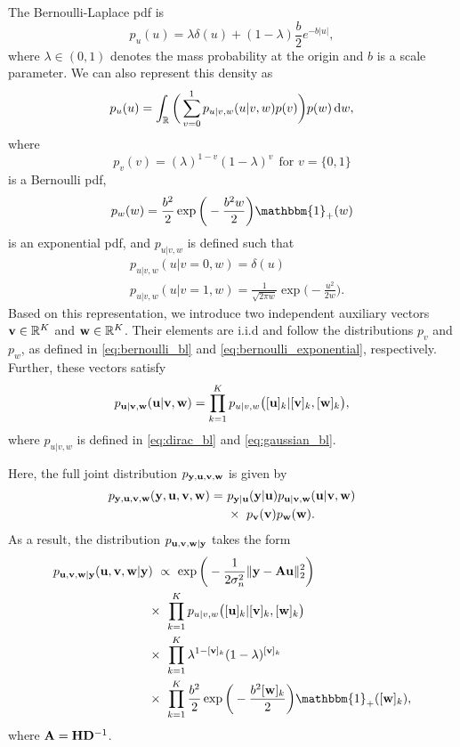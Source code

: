 \documentclass[journal]{IEEEtran}
\begin{document}
The Bernoulli-Laplace pdf is
\begin{equation}\label{eq:pdf_bl}
    p_u(u) = \lambda \delta(u) + (1-\lambda)\frac{b}{2}e^{-b |u|},  
\end{equation}
where $\lambda \in (0,1)$ denotes the mass probability at the origin and $b$ is a scale parameter. We can also represent this density as
\begin{equation}
    p_u(u) = \int_{\mathbb{R}} \bigg(\sum_{v=0}^{1} p_{u|v, w}(u|v, w) p(v) \bigg) p(w) \,\mathrm{d} w,
\end{equation}
where
\begin{equation}\label{eq:bernoulli_bl}
    p_{v}(v) = (\lambda)^{1-v}(1-\lambda)^{v} \ \ \text{for } v = \{0,1\}
\end{equation}
is a Bernoulli pdf,
\begin{equation}\label{eq:bernoulli_exponential}
    p_{w}(w) = \frac{b^2}{2}\exp\bigg(-\frac{b^2 w}{2}\bigg) \mathbbm{1}_{+}(w)
\end{equation}
is an exponential pdf, and $p_{u|v, w}$ is defined such that
\begin{align}
    &p_{u|v, w}(u|v=0, w) = \delta(u) \label{eq:dirac_bl}\\
    &p_{u|v, w}(u|v=1, w) = \frac{1}{\sqrt{2 \pi w}} \exp\bigg(-\frac{u^2}{2 w}\bigg) \label{eq:gaussian_bl}.
\end{align}
Based on this representation, we introduce two independent auxiliary vectors ${\bf{v}} \in \mathbb{R}^K$ and ${\bf{w}} \in \mathbb{R}^K$. Their elements are i.i.d and follow the distributions $p_{v}$ and $p_{w}$, as defined in \eqref{eq:bernoulli_bl} and \eqref{eq:bernoulli_exponential}, respectively. Further, these vectors satisfy
\begin{equation}\label{eq:aux_var_property_bl}
    p_{{\bf{u}} | {\bf{v}}, {\bf{w}}}({\bf{u}} | {\bf{v}}, {\bf{w}}) = \prod_{k=1}^{K}p_{u|v, w}\big([{\bf{u}}]_k | [{\bf{v}}]_k, [{\bf{w}}]_k\big),
\end{equation}
where $p_{u|v, w}$ is defined in \eqref{eq:dirac_bl} and \eqref{eq:gaussian_bl}.

Here, the full joint distribution $p_{{\bf{y}}, {\bf{u}}, {\bf{v}}, {\bf{w}}}$ is given by 
\begin{align}
    p_{{\bf{y}}, {\bf{u}}, {\bf{v}}, {\bf{w}}}({\bf{y}}, {\bf{u}}, {\bf{v}}, {\bf{w}}) = \ &p_{{\bf{y}} | {\bf{u}}}({\bf{y}} | {\bf{u}}) p_{{\bf{u}} | {\bf{v}}, {\bf{w}}}({\bf{u}} | {\bf{v}}, {\bf{w}}) \nonumber \\ 
    &\times \ p_{{\bf{v}}}({\bf{v}}) p_{{\bf{w}}}({\bf{w}}).
\end{align}
As a result, the distribution $p_{{\bf{u}}, {\bf{v}}, {\bf{w}}|{\bf{y}}}$ takes the form
\begin{align}\label{eq:conditional_joint_distribution_bl}
    p_{\M u, \M v, \M w | \M y}(\M u, \M v, \M w | \M y&) \ \propto \ \exp\bigg(-\frac{1}{2 \sigma_n^2} \|\M y - \M A \M u \|_{2}^{2}\bigg) \nonumber \\
    &\times \ \prod_{k=1}^{K}p_{u|v, w}\big([\M u]_k | [\M v]_k, [\M w]_k\big) \nonumber \\
    &\times \ \prod_{k=1}^{K} \lambda^{1-[\M v]_k}(1-\lambda)^{[\M v]_k} \nonumber \\
    &\times \ \prod_{k=1}^{K} \frac{b^2}{2}\exp\bigg(-\frac{b^2 [\M w]_k}{2}\bigg) \mathbbm{1}_{+}([\M w]_k),
\end{align}
where ${\bf{A}} = {\bf{H}} {\bf{D}}^{-1}$. 
\end{document}
